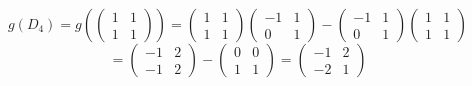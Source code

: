 \documentclass[a4paper]{article}
\theoremstyle{break}
\theoremstyle{break}
\theoremstyle{break}
\theoremstyle{break}
\begin{document}
\begin{enumerate}
        \vspace{2em}
        \[
        g(D_4) = g \left( \begin{pmatrix} 1 & 1\\1 & 1 \end{pmatrix} \right) =
        \begin{pmatrix} 
          1 & 1\\
          1 & 1
        \end{pmatrix}
        \begin{pmatrix} 
          -1 & 1\\
          0 & 1
        \end{pmatrix}
        -
        \begin{pmatrix} 
          -1 & 1\\
          0 & 1
        \end{pmatrix}
        \begin{pmatrix} 
          1 & 1\\
          1 & 1
        \end{pmatrix}
        \]
        \[
          = \begin{pmatrix} 
            -1 & 2\\
            -1 & 2
          \end{pmatrix} 
          -
          \begin{pmatrix} 
            0 & 0\\
            1 & 1
          \end{pmatrix} 
          =
          \begin{pmatrix} 
            -1 & 2\\
            -2 & 1
          \end{pmatrix} 
        \]


\end{enumerate}
\end{document}
